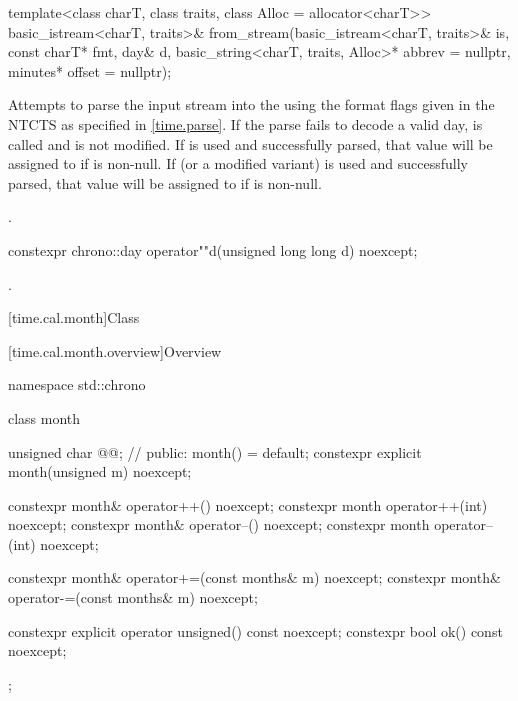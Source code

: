 %
\begin{itemdecl}
template<class charT, class traits, class Alloc = allocator<charT>>
  basic_istream<charT, traits>&
    from_stream(basic_istream<charT, traits>& is, const charT* fmt,
                day& d, basic_string<charT, traits, Alloc>* abbrev = nullptr,
                minutes* offset = nullptr);
\end{itemdecl}

\begin{itemdescr}
\pnum
\effects
Attempts to parse the input stream 
into the   using
the format flags given in the NTCTS 
as specified in \ref{time.parse}.
If the parse fails to decode a valid day,
 is called and
 is not modified.
If  is used and successfully parsed,
that value will be assigned to  if  is non-null.
If  (or a modified variant) is used and successfully parsed,
that value will be assigned to  if  is non-null.

\pnum
\returns
{}.
\end{itemdescr}

%
\begin{itemdecl}
constexpr chrono::day operator""d(unsigned long long d) noexcept;
\end{itemdecl}

\begin{itemdescr}
\pnum
\returns
{}.
\end{itemdescr}

[time.cal.month]{Class }

[time.cal.month.overview]{Overview}

\begin{codeblock}
namespace std::chrono {
  class month {
    unsigned char @@;           // \expos
  public:
    month() = default;
    constexpr explicit month(unsigned m) noexcept;

    constexpr month& operator++()    noexcept;
    constexpr month  operator++(int) noexcept;
    constexpr month& operator--()    noexcept;
    constexpr month  operator--(int) noexcept;

    constexpr month& operator+=(const months& m) noexcept;
    constexpr month& operator-=(const months& m) noexcept;

    constexpr explicit operator unsigned() const noexcept;
    constexpr bool ok() const noexcept;
  };
}
\end{codeblock}

